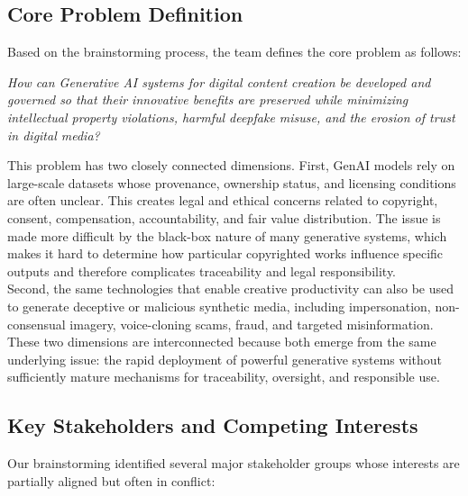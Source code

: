 \subsection{Core Problem Definition}
Based on the brainstorming process, the team defines the core problem as follows:

\begin{tcolorbox}[
    colback=blue!5!white,
    colframe=blue!50!black,
    coltitle=white,
    colbacktitle=blue!50!black,
    boxrule=1.5pt,
    enhanced,
    attach boxed title to top left = {yshift=-2mm, xshift=5mm},
    title={\large \textbf{Core problem}}
  ]
  \textit{How can Generative AI systems for digital content creation be developed and governed so that their innovative benefits are preserved while minimizing intellectual property violations, harmful deepfake misuse, and the erosion of trust in digital media?}
\end{tcolorbox}

This problem has two closely connected dimensions. First, GenAI models rely on large-scale datasets whose provenance, ownership status, and licensing conditions are often unclear. This creates legal and ethical concerns related to copyright, consent, compensation, accountability, and fair value distribution. The issue is made more difficult by the black-box nature of many generative systems, which makes it hard to determine how particular copyrighted works influence specific outputs and therefore complicates traceability and legal responsibility. \\

Second, the same technologies that enable creative productivity can also be used to generate deceptive or malicious synthetic media, including impersonation, non-consensual imagery, voice-cloning scams, fraud, and targeted misinformation. These two dimensions are interconnected because both emerge from the same underlying issue: the rapid deployment of powerful generative systems without sufficiently mature mechanisms for traceability, oversight, and responsible use.

\subsection{Key Stakeholders and Competing Interests}
Our brainstorming identified several major stakeholder groups whose interests are partially aligned but often in conflict:

